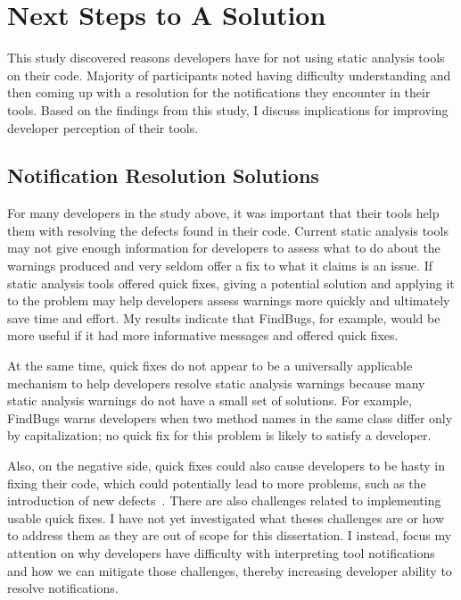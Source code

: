 \section{Next Steps to A Solution}
This study discovered reasons developers have for not using static analysis tools on their code.
Majority of participants noted having difficulty understanding and then coming up with a resolution for the notifications they encounter in their tools.
Based on the findings from this study, I discuss implications for improving developer perception of their tools.

\subsection{Notification Resolution Solutions}

For many developers in the study above, it was important that their tools help them with resolving the defects found in their code.
Current static analysis tools may not give enough information for
developers to assess what to do about the warnings produced and very seldom
offer a fix to what it claims is an issue. If static analysis tools offered
quick fixes, giving a potential solution and applying it to the problem may help
developers assess warnings more quickly and ultimately save time and effort. My
results indicate that FindBugs, for example, would be more useful if it had more
informative messages and offered quick fixes. 

At the same time, quick fixes do not appear to be a universally applicable mechanism to help
developers resolve static analysis warnings because many static analysis
warnings do not have a small set of solutions. For example, FindBugs warns
developers when two method names in the same class differ only by
capitalization; no quick fix for this problem is likely to satisfy a developer.

Also, on the negative side, quick fixes could also cause
developers to be hasty in fixing their code, which could potentially lead to
more problems, such as the introduction of new defects~\cite{Mucslu:2012:Speculative}. 
There are also challenges related to implementing usable quick fixes. I
have not yet investigated what theses challenges are or how to address them as
they are out of scope for this dissertation. 
I instead, focus my attention on why developers have difficulty with interpreting tool notifications and how we can mitigate those challenges, thereby increasing developer ability to resolve notifications.


